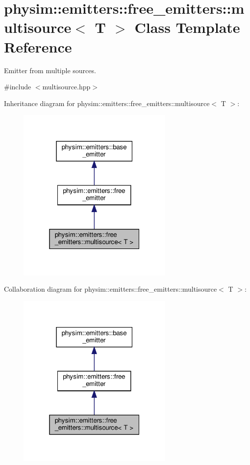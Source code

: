 \hypertarget{classphysim_1_1emitters_1_1free__emitters_1_1multisource}{}\section{physim\+:\+:emitters\+:\+:free\+\_\+emitters\+:\+:multisource$<$ T $>$ Class Template Reference}
\label{classphysim_1_1emitters_1_1free__emitters_1_1multisource}


Emitter from multiple sources.  




{\ttfamily \#include $<$multisource.\+hpp$>$}



Inheritance diagram for physim\+:\+:emitters\+:\+:free\+\_\+emitters\+:\+:multisource$<$ T $>$\+:\nopagebreak
\begin{figure}[H]
\begin{center}
\leavevmode
\includegraphics[width=217pt]{classphysim_1_1emitters_1_1free__emitters_1_1multisource__inherit__graph}
\end{center}
\end{figure}


Collaboration diagram for physim\+:\+:emitters\+:\+:free\+\_\+emitters\+:\+:multisource$<$ T $>$\+:\nopagebreak
\begin{figure}[H]
\begin{center}
\leavevmode
\includegraphics[width=217pt]{classphysim_1_1emitters_1_1free__emitters_1_1multisource__coll__graph}
\end{center}
\end{figure}
